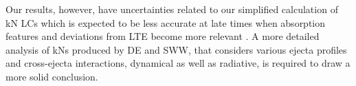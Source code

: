 Our results, however, have uncertainties related to our simplified calculation 
of \ac{kN} \acp{LC} which is expected to be less accurate at late times when 
absorption features and deviations from \ac{LTE} become more relevant 
\citep[see \eg][]{Smartt:2017fuw}. 
%
A more detailed analysis of \acp{kN} produced by \ac{DE} and \ac{SWW}, that 
considers various ejecta profiles and cross-ejecta interactions, dynamical as 
well as radiative, is required to draw a more solid conclusion. 
%

%

